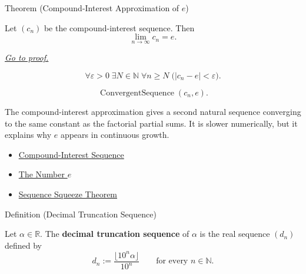 
\begin{theorembox}{Theorem (Compound-Interest Approximation of $e$)}
\begin{theorem}
\label{thm:compound-interest-approximation-e}
Let $(c_n)$ be the compound-interest sequence. Then
\[
  \lim_{n\to\infty}c_n=e.
\]

\smallskip
\noindent
\hyperref[prf:compound-interest-approximation-e]{\textit{Go to proof.}}
\end{theorem}
\end{theorembox}

\begin{remark*}
\[
\forall \varepsilon>0\;\exists N\in\mathbb{N}\;\forall n\ge N
\;\bigl(|c_n-e|<\varepsilon\bigr).
\]
\end{remark*}

\begin{remark*}
\[
\operatorname{ConvergentSequence}(c_n,e).
\]
\end{remark*}

\begin{remark*}[Interpretation]
The compound-interest approximation gives a second natural sequence
converging to the same constant as the factorial partial sums. It is slower
numerically, but it explains why $e$ appears in continuous growth.
\end{remark*}

\begin{dependencies}
\begin{itemize}
  \item \hyperref[def:compound-interest-sequence]{Compound-Interest Sequence}
  \item \hyperref[def:number-e]{The Number $e$}
  \item \hyperref[thm:sequence-squeeze-theorem]{Sequence Squeeze Theorem}
\end{itemize}
\end{dependencies}


\begin{definitionbox}{Definition (Decimal Truncation Sequence)}
\begin{definition}
\label{def:decimal-truncation-sequence}
Let $\alpha\in\mathbb{R}$. The \textbf{decimal truncation sequence} of
$\alpha$ is the real sequence $(d_n)$ defined by
\[
  d_n:=\frac{\lfloor 10^n\alpha\rfloor}{10^n}
  \qquad\text{for every } n\in\mathbb{N}.
\]
\end{definition}
\end{definitionbox}

